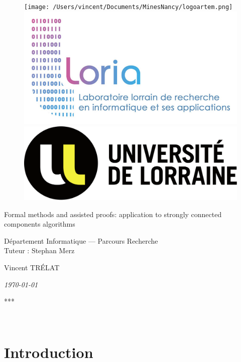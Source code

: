 \documentclass[a4 paper, 12pt]{article}
\theoremstyle{definition}
\begin{document}
\begin{titlepage}
    \begin{figure}[!h]
        \centering
        \texttt{[image: /Users/vincent/Documents/MinesNancy/logoartem.png]}
        \hspace{1cm}
        \includegraphics[height = .1\textwidth]{img/logoloria.jpg}
        \hspace{1cm}
        \includegraphics[height = .1\textwidth]{img/logoUL.png}
    \end{figure}
    \vspace{3cm}

    \begin{center}
        \huge{Formal methods and assisted proofs: application to strongly connected components algorithms}
    \end{center}
    \vspace{1cm}
    \begin{center}
        \large{Département Informatique --- Parcours Recherche \\ Tuteur : Stephan Merz}
    \end{center}
    \vspace{1 cm}
    \begin{center}
        Vincent TRÉLAT
    \end{center}
    \vspace{2 cm}
    \begin{center}
        \textit{\today}
    \end{center}
    \vspace{2 cm}
    \begin{center}
        ***
    \end{center}
    
\end{titlepage}
\restoregeometry
\pagebreak
~
\pagebreak

\tableofcontents
\pagebreak

\section{Introduction}
\end{document}
